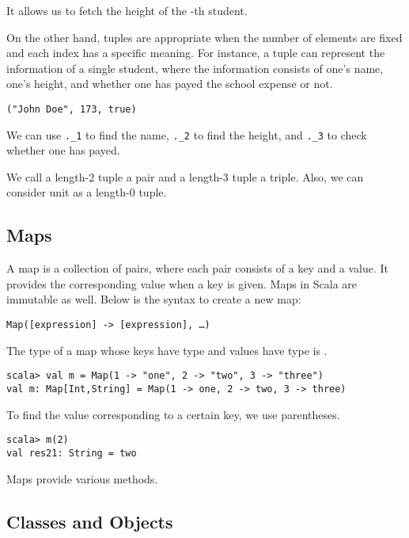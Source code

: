 It allows us to fetch the height of the -th student.

On the other hand, tuples are appropriate when the number of elements
are fixed and each index has a specific meaning. For instance,
a tuple can represent the information of a single student, where the information
consists of one's name, one's height, and whether one has payed the school
expense or not.

\begin{verbatim}
("John Doe", 173, true)
\end{verbatim}

We can use \verb+._1+ to find the name, \verb+._2+ to find the height, and
\verb+._3+ to check whether one has payed.

We call a length-2 tuple a pair and a length-3 tuple a triple. Also, we can
consider unit as a length-0 tuple.

\subsection{Maps}

A map is a collection of pairs, where each pair consists of a key and a value.
It provides the corresponding value when a key is given.
Maps in Scala are immutable as well. Below is the syntax to create a new map:

\begin{verbatim}
Map([expression] -> [expression], …)
\end{verbatim}

The type of a map whose keys have type  and values have type  is
.

\begin{verbatim}
scala> val m = Map(1 -> "one", 2 -> "two", 3 -> "three")
val m: Map[Int,String] = Map(1 -> one, 2 -> two, 3 -> three)
\end{verbatim}

To find the value corresponding to a certain key, we use parentheses.

\begin{verbatim}
scala> m(2)
val res21: String = two
\end{verbatim}

Maps provide various
methods.

\subsection{Classes and Objects}

